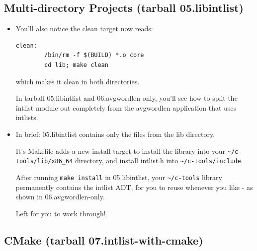 \documentclass[handout]{beamer}
\begin{document}
\subsection{Multi-directory Projects (tarball 05.libintlist)}

\begin{frame}[fragile]
\begin{itemize}
\item
You'll also notice the \alert{clean} target now reads:
\begin{verbatim}
clean:
        /bin/rm -f $(BUILD) *.o core
        cd lib; make clean
\end{verbatim}
which makes it clean in both directories.

\pitem
In tarball \alert{05.libintlist} and \alert{06.avgwordlen-only},
you'll see how to split the intlist module out completely from the
avgwordlen application that uses intlists.

\item
In brief: \alert{05.libintlist} contains only the files from
the \alert{lib} directory.

\pitem
It's Makefile adds a new \alert{install} target to install the library into
your \verb+~/c-tools/lib/x86_64+ directory,
and install intlist.h into \verb+~/c-tools/include+.

\pitem
After running \verb+make install+ in \alert{05.libintlist}, your
\verb+~/c-tools+ library permanently contains the intlist ADT, for you to
reuse whenever you like - as shown in \alert{06.avgwordlen-only}.

\pitem
Left for you to work through!

\end{itemize}
\end{frame}

\subsection{CMake (tarball 07.intlist-with-cmake)}
\end{document}
